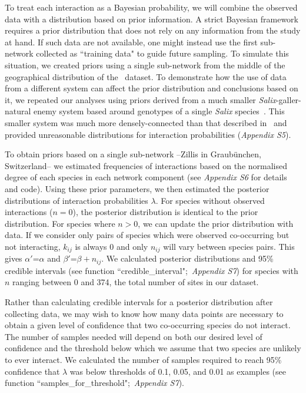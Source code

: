 \documentclass[12pt]{article}
\begin{document}
\begin{spacing}{2.0}
        To treat each interaction as a Bayesian probability, we will combine the observed data with a distribution based on prior information. A strict Bayesian framework requires a prior distribution that does not rely on any information from the study at hand. If such data are not available, one might instead use the first sub-network collected as ``training data" to guide future sampling. To simulate this situation, we created priors using a single sub-network from the middle of the geographical distribution of the~\citet{Kopelke2017} dataset. To demonstrate how the use of data from a different system can affect the prior distribution and conclusions based on it, we repeated our analyses using priors derived from a much smaller \emph{Salix}-galler-natural enemy system based around genotypes of a single \emph{Salix} species~\citep[Data available from the Dryad Digital Repository: https://doi.org/10.5061/dryad.g7805]{Barbour2016}\nocite{Barbour2016Dryad}. This smaller system was much more densely-connected than that described in~\citet{Kopelke2017} and provided unreasonable distributions for interaction probabilities (\emph{Appendix S5}). 


        To obtain priors based on a single sub-network --Zillis in Graub\"{u}nchen, Switzerland-- we estimated frequencies of interactions based on the normalised degree of each species in each network component (see \emph{Appendix S6} for details and code). Using these prior parameters, we then estimated the posterior distributions of interaction probabilities $\lambda$. For species without observed interactions ($n = 0$), the posterior distribution is identical to the prior distribution. For species where $n>0$, we can update the prior distribution with data. If we consider only pairs of species which were observed co-occurring but not interacting, $k_{ij}$ is always 0 and only $n_{ij}$ will vary between species pairs. This gives $\alpha'$=$\alpha$ and $\beta'$=$\beta + n_{ij}$. We calculated posterior distributions and 95\% credible intervals (see function ``credible\_interval";~\emph{Appendix S7}) for species with $n$ ranging between 0 and 374, the total number of sites in our dataset. 


        Rather than calculating credible intervals for a posterior distribution after collecting data, we may wish to know how many data points are necessary to obtain a given level of confidence that two co-occurring species do not interact. The number of samples needed will depend on both our desired level of confidence and the threshold below which we assume that two species are unlikely to ever interact. We calculated the number of samples required to reach 95\% confidence that $\lambda$ was below thresholds of 0.1, 0.05, and 0.01 as examples (see function ``samples\_for\_threshold";~\emph{Appendix S7}).



\end{spacing}
\end{document}
